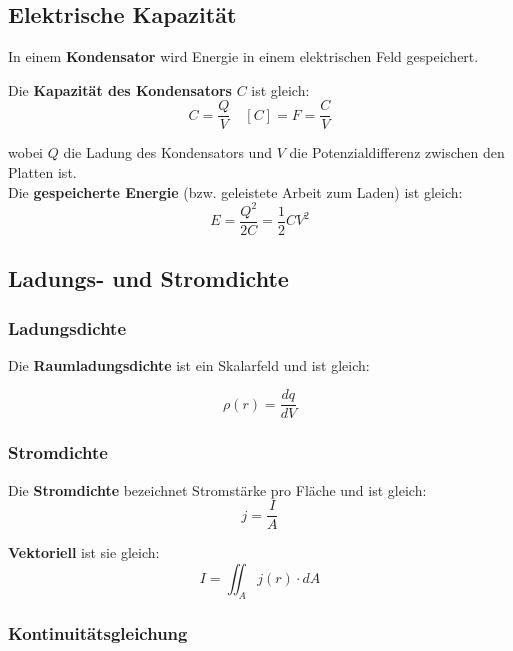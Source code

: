 \documentclass[7pt]{article}
\begin{document}
\begin{multicols*}{3}
\subsection{Elektrische Kapazit{\"a}t}

In einem \textbf{Kondensator} wird Energie in einem elektrischen Feld gespeichert.

Die \textbf{Kapazit{\"a}t des Kondensators} $C$ ist gleich:
\begin{equation*}
	C = \frac{Q}{V} \quad [C] = F = \frac{C}{V}
\end{equation*}

wobei $Q$ die Ladung des Kondensators und $V$ die Potenzialdifferenz zwischen den Platten ist. \\

Die \textbf{gespeicherte Energie} (bzw. geleistete Arbeit zum Laden) ist gleich:
\begin{equation*}
	E = \frac{Q^2}{2C} = \frac{1}{2}CV^2
\end{equation*}

\subsection{Ladungs- und Stromdichte}

\subsubsection{Ladungsdichte}

Die \textbf{Raumladungsdichte} ist ein Skalarfeld und ist gleich:

\begin{equation*}
	\rho(r) = \frac{dq}{dV}
\end{equation*}

\subsubsection{Stromdichte}

Die \textbf{Stromdichte} bezeichnet Stromst{\"a}rke pro Fl{\"a}che und ist gleich:
\begin{equation*}
	j = \frac{I}{A}
\end{equation*}

\textbf{Vektoriell} ist sie gleich:
\begin{equation*}
	I = \iint_A j(r)\cdot dA
\end{equation*}

\subsubsection{Kontinuit{\"a}tsgleichung}


\end{multicols*}
\end{document}
